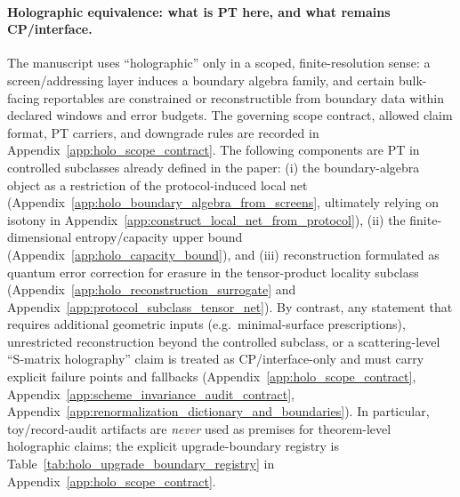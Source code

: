 \paragraph{Holographic equivalence: what is PT here, and what remains CP/interface.}
\AuditTag The manuscript uses ``holographic'' only in a scoped, finite-resolution sense: a screen/addressing layer induces a boundary algebra family,
and certain bulk-facing reportables are constrained or reconstructible from boundary data within declared windows and error budgets.
The governing scope contract, allowed claim format, PT carriers, and downgrade rules are recorded in Appendix~\ref{app:holo_scope_contract}.
The following components are PT in controlled subclasses already defined in the paper:
(i) the boundary-algebra object as a restriction of the protocol-induced local net (Appendix~\ref{app:holo_boundary_algebra_from_screens},
ultimately relying on isotony in Appendix~\ref{app:construct_local_net_from_protocol}),
(ii) the finite-dimensional entropy/capacity upper bound (Appendix~\ref{app:holo_capacity_bound}),
and (iii) reconstruction formulated as quantum error correction for erasure in the tensor-product locality subclass
(Appendix~\ref{app:holo_reconstruction_surrogate} and Appendix~\ref{app:protocol_subclass_tensor_net}).
By contrast, any statement that requires additional geometric inputs (e.g.\ minimal-surface prescriptions), unrestricted reconstruction beyond the controlled subclass,
or a scattering-level ``S-matrix holography'' claim is treated as CP/interface-only and must carry explicit failure points and fallbacks
(Appendix~\ref{app:holo_scope_contract}, Appendix~\ref{app:scheme_invariance_audit_contract}, Appendix~\ref{app:renormalization_dictionary_and_boundaries}).
\AuditTag In particular, toy/record-audit artifacts are \emph{never} used as premises for theorem-level holographic claims; the explicit upgrade-boundary registry
is Table~\ref{tab:holo_upgrade_boundary_registry} in Appendix~\ref{app:holo_scope_contract}.

